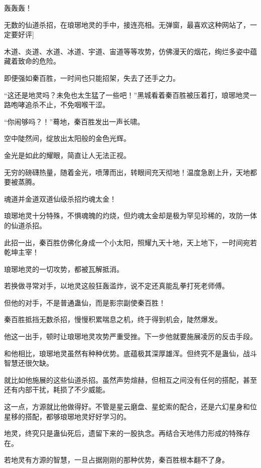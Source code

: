 
\begin{this_body}

轰轰轰！

无数的仙道杀招，在琅琊地灵的手中，接连亮相。无弹窗，最喜欢这种网站了，一定要好评]

木道、炎道、水道、冰道、宇道、宙道等等攻势，仿佛漫天的烟花，绚烂多姿中蕴藏着致命的危险。

即便强如秦百胜，一时间也只能招架，失去了还手之力。

“这还是地灵吗？未免也太生猛了一些吧！”黑城看着秦百胜被压着打，琅琊地灵一路咆哮追杀不止，不免咽喉干涩。

“你闹够吗？！”蓦地，秦百胜发出一声长啸。

空中陡然间，绽放出太阳般的金色光辉。

金光是如此的耀眼，简直让人无法正视。

无穷的磅礴热量，随着金光，喷薄而出，转眼间充天彻地！温度急剧上升，天地都要被蒸腾。

魂道并金道双道仙级杀招灼魂太金！

琅琊地灵十分特殊，不惧魂魄的灼烧，但灼魂太金却是极为罕见珍稀的，攻防一体的仙道杀招。

此招一出，秦百胜仿佛化身成一个小太阳，照耀九天十地，天上地下，一时间宛若乾坤主宰！

琅琊地灵的一切攻势，都被瓦解抵消。

若换做寻常对手，以地灵这般狂轰滥炸，说不定还真能乱拳打死老师傅。

但他的对手，不是普通蛊仙，而是影宗副使秦百胜！

秦百胜抵挡无数杀招，慢慢积累喘息之机，终于得到机会，陡然爆发。

他这一出手，顿时让琅琊地灵攻势严重受挫。下一步他就要施展凌厉的反击手段。

和他相比，琅琊地灵虽然有种种优势。底蕴极其深厚雄浑。但终究不是蛊仙，战斗智慧还很欠缺。

就比如他施展的这些仙道杀招。虽然声势煊赫，但相互之间没有任何的搭配，甚至还有内部干扰，耗损了不少威能。

这一点，方源就比他做得好。不管是星云磨盘、星蛇索的配合，还是六幻星身和位星移的搭配，都够琅琊地灵好好学习的。

地灵，终究只是蛊仙死后，遗留下来的一股执念。再结合天地伟力形成的特殊存在。

若地灵有方源的智慧，一旦占据刚刚的那种优势，秦百胜根本翻不了身。


\end{this_body}
